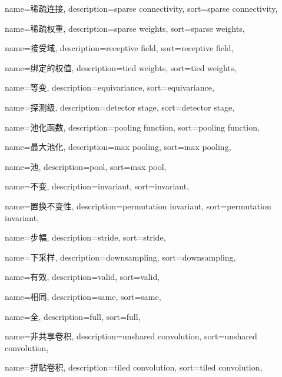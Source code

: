 {
  name=稀疏连接,
  description={sparse connectivity},
  sort={sparse connectivity},
}

{
  name=稀疏权重,
  description={sparse weights},
  sort={sparse weights},
}

{
  name=接受域,
  description={receptive field},
  sort={receptive field},
}

{
  name=绑定的权值,
  description={tied weights},
  sort={tied weights},
}

{
  name=等变,
  description={equivariance},
  sort={equivariance},
}

{
  name=探测级,
  description={detector stage},
  sort={detector stage},
}

{
  name=池化函数,
  description={pooling function},
  sort={pooling function},
}

{
  name=最大池化,
  description={max pooling},
  sort={max pooling},
}

{
  name=池,
  description={pool},
  sort={max pool},
}

{
  name=不变,
  description={invariant},
  sort={invariant},
}

{
  name=置换不变性,
  description={permutation invariant},
  sort={permutation invariant},
}

{
  name=步幅,
  description={stride},
  sort={stride},
}

{
  name=下采样,
  description={downsampling},
  sort={downsampling},
}

{
  name=有效,
  description={valid},
  sort={valid},
}

{
  name=相同,
  description={same},
  sort={same},
}

{
  name=全,
  description={full},
  sort={full},
}

{
  name=非共享卷积,
  description={unshared convolution},
  sort={unshared convolution},
}

{
  name=拼贴卷积,
  description={tiled convolution},
  sort={tiled convolution},
}

